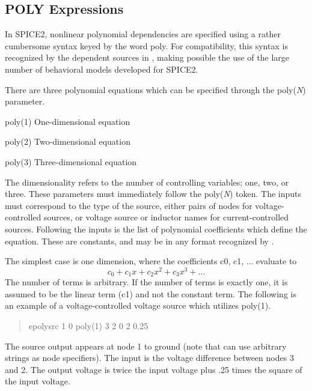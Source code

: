\subsection{POLY Expressions}
\label{polyspec}


In SPICE2, nonlinear polynomial dependencies are specified using a
rather cumbersome syntax keyed by the word {\vt poly}.  For
compatibility, this syntax is recognized by the dependent sources in
{\WRspice}, making possible the use of the large number of behavioral
models developed for SPICE2.

There are three polynomial equations which can be specified through the
{\vt poly({\it N\/})} parameter.
\begin{description}
\item{\vt poly(1) \rm One-dimensional equation}
\item{\vt poly(2) \rm Two-dimensional equation}
\item{\vt poly(3) \rm Three-dimensional equation}
\end{description}
The dimensionality refers to the number of controlling variables; one,
two, or three.  These parameters must immediately follow the {\vt
poly({\it N\/})} token.  The inputs must correspond to the type of the
source, either pairs of nodes for voltage-controlled sources, or
voltage source or inductor names for current-controlled sources. 
Following the inputs is the list of polynomial coefficients which
define the equation.  These are constants, and may be in any format
recognized by {\WRspice}.

The simplest case is one dimension, where the coefficients {\vt c0, c1, ...}
evaluate to
\begin{displaymath}
c_0 + c_1x + c_2x^2 + c_3x^3 + ...
\end{displaymath}
The number of terms is arbitrary.  If the number of terms is exactly one,
it is assumed to be the linear term ({\vt c1}) and not the constant
term.  The following is an example of a voltage-controlled voltage source
which utilizes {\vt poly(1)}.
\begin{quote}\vt
epolysrc 1 0 poly(1) 3 2 0 2 0.25
\end{quote}
The source output appears at node 1 to ground (note that {\WRspice} can use
arbitrary strings as node specifiers).  The input is the voltage difference
between nodes 3 and 2.  The output voltage is twice the input voltage
plus .25 times the square of the input voltage.

